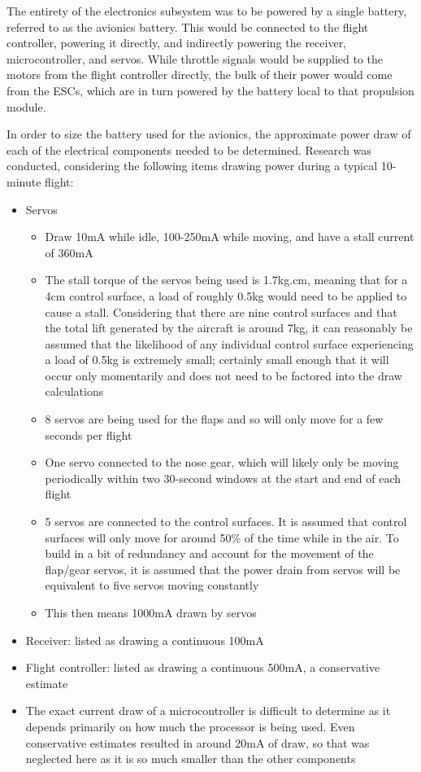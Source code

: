 \documentclass[../../main.tex]{subfiles}
\begin{document}
The entirety of the electronics subsystem was to be powered by a single battery, referred to as the avionics battery.
This would be connected to the flight controller, powering it directly, and indirectly powering the receiver, microcontroller, and servos.
While throttle signals would be supplied to the motors from the flight controller directly, the bulk of their power would come from the ESCs, which are in turn powered by the battery local to that propulsion module. 

In order to size the battery used for the avionics, the approximate power draw of each of the electrical components needed to be determined.
Research was conducted, considering the following items drawing power during a typical 10-minute flight: 

\begin{itemize}
    \item Servos
        \begin{itemize}
            \item Draw 10mA while idle, 100-250mA while moving, and have a stall current of 360mA 
            \item The stall torque of the servos being used is 1.7kg.cm, meaning that for a 4cm control surface, a load of roughly 0.5kg would need to be applied to cause a stall.
                Considering that there are nine control surfaces and that the total lift generated by the aircraft is around 7kg, it can reasonably be assumed that the likelihood of any individual control surface experiencing a load of 0.5kg is extremely small; certainly small enough that it will occur only momentarily and does not need to be factored into the draw calculations 
            \item 8 servos are being used for the flaps and so will only move for a few seconds per flight 
            \item One servo connected to the nose gear, which will likely only be moving periodically within two 30-second windows at the start and end of each flight 
            \item 5 servos are connected to the control surfaces.
                It is assumed that control surfaces will only move for around 50\% of the time while in the air.
                To build in a bit of redundancy and account for the movement of the flap/gear servos, it is assumed that the power drain from servos will be equivalent to five servos moving constantly 
            \item This then means 1000mA drawn by servos 
        \end{itemize}
    \item Receiver: listed as drawing a continuous 100mA 
    \item Flight controller: listed as drawing a continuous 500mA, a conservative estimate 
    \item The exact current draw of a microcontroller is difficult to determine as it depends primarily on how much the processor is being used.
        Even conservative estimates resulted in around 20mA of draw, so that was neglected here as it is so much smaller than the other components 
\end{itemize}
\end{document}

